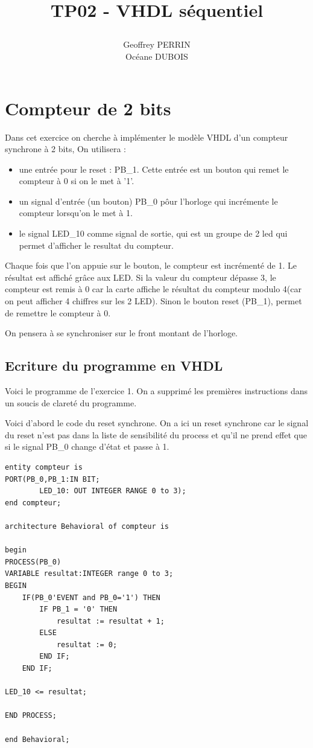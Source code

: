\documentclass[11pt]{report}
\title{\textbf{TP02 - VHDL séquentiel}
\author{Geoffrey PERRIN \\ Océane DUBOIS\\}
\date{}}
\begin{document}
\maketitle

\newpage


\section{Compteur de 2 bits}

Dans cet exercice on cherche à implémenter le  modèle VHDL d'un compteur synchrone à 2 bits, 
On utilisera : \begin{itemize}
	 \item  une entrée  pour le reset : PB\_1. Cette entrée est un bouton qui remet le compteur à 0 si on le met à '1'.
	\item un signal d'entrée (un bouton) PB\_0 pôur l'horloge qui incrémente le compteur lorsqu'on le met à 1.
	 \item le signal LED\_10 comme signal de sortie, qui est un groupe de 2 led qui permet d'afficher le resultat du compteur.
	 
	\end{itemize}

\medskip

Chaque fois que l'on appuie sur le bouton, le compteur est incrémenté de 1. Le résultat est affiché grâce aux LED. Si la valeur du compteur dépasse 3, le compteur est remis à 0 car la carte affiche le résultat du compteur modulo 4(car on peut afficher 4 chiffres sur les 2 LED). Sinon le bouton reset (PB\_1), permet de remettre le compteur à 0.

\medskip

On pensera à se synchroniser sur le front montant de l'horloge.

\subsection{ Ecriture du programme en VHDL}

Voici le programme de l'exercice 1. On a supprimé les premières instructions dans un soucis de clareté du programme.

Voici d'abord le code du reset synchrone. On a ici un reset synchrone car le signal du reset n'est pas dans la liste de sensibilité du process et qu'il ne prend effet que si le signal PB\_0 change d'état et passe à 1.

\begin{lstlisting}
entity compteur is
PORT(PB_0,PB_1:IN BIT;
		LED_10: OUT INTEGER RANGE 0 to 3);
end compteur;

architecture Behavioral of compteur is

begin
PROCESS(PB_0)
VARIABLE resultat:INTEGER range 0 to 3;
BEGIN
	IF(PB_0'EVENT and PB_0='1') THEN
		IF PB_1 = '0' THEN 
			resultat := resultat + 1;
		ELSE
			resultat := 0;
		END IF;
	END IF;

LED_10 <= resultat;

END PROCESS;

end Behavioral;

\end{lstlisting}
\end{document}
